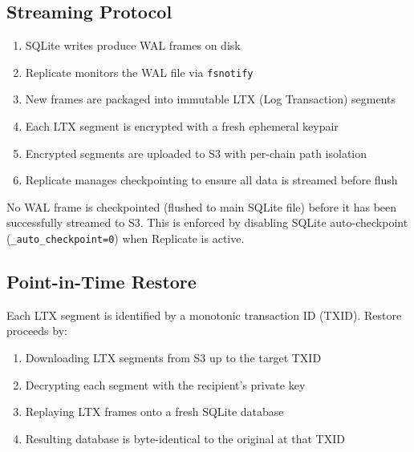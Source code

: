 \subsection{Streaming Protocol}

\begin{enumerate}
  \item SQLite writes produce WAL frames on disk
  \item Replicate monitors the WAL file via \texttt{fsnotify}
  \item New frames are packaged into immutable LTX (Log Transaction) segments
  \item Each LTX segment is encrypted with a fresh ephemeral keypair
  \item Encrypted segments are uploaded to S3 with per-chain path isolation
  \item Replicate manages checkpointing to ensure all data is streamed before flush
\end{enumerate}

\begin{invariant}[Completeness]
No WAL frame is checkpointed (flushed to main SQLite file) before it has been successfully
streamed to S3. This is enforced by disabling SQLite auto-checkpoint
(\texttt{\_auto\_checkpoint=0}) when Replicate is active.
\end{invariant}

\subsection{Point-in-Time Restore}

Each LTX segment is identified by a monotonic transaction ID (TXID). Restore proceeds by:

\begin{enumerate}
  \item Downloading LTX segments from S3 up to the target TXID
  \item Decrypting each segment with the recipient's private key
  \item Replaying LTX frames onto a fresh SQLite database
  \item Resulting database is byte-identical to the original at that TXID
\end{enumerate}


